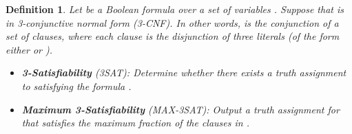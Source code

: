 \documentclass{article}
\newtheorem{defn}[thm]{Definition}
\begin{document}
\begin{defn}
Let  be a Boolean formula over a set of variables .  Suppose that  is in 3\nobreakdash-conjunctive normal form (3\nobreakdash-CNF). In other words,  is the conjunction of a set  of clauses, where each clause is the disjunction of three literals (of the form either  or ).  

\begin{itemize}
\item \textbf{3\nobreakdash-Satisfiability} (3SAT): Determine whether there exists a truth assignment to  satisfying the formula .

\item \textbf{Maximum 3\nobreakdash-Satisfiability} (MAX-3SAT): Output a truth assignment for  that satisfies the maximum fraction of the clauses in .
\end{itemize}
\end{defn}
\end{document}
